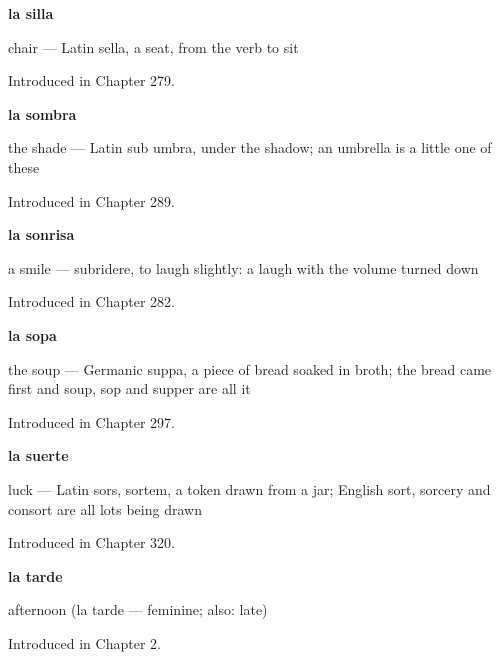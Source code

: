 \noindent\begin{minipage}[t]{\linewidth}
\raggedright
\textbf{la silla}\par
\small chair — Latin sella, a seat, from the verb to sit\par
\footnotesize Introduced in Chapter 279.
\end{minipage}\par\medskip

\noindent\begin{minipage}[t]{\linewidth}
\raggedright
\textbf{la sombra}\par
\small the shade — Latin sub umbra, under the shadow; an umbrella is a little one of these\par
\footnotesize Introduced in Chapter 289.
\end{minipage}\par\medskip

\noindent\begin{minipage}[t]{\linewidth}
\raggedright
\textbf{la sonrisa}\par
\small a smile — subridere, to laugh slightly: a laugh with the volume turned down\par
\footnotesize Introduced in Chapter 282.
\end{minipage}\par\medskip

\noindent\begin{minipage}[t]{\linewidth}
\raggedright
\textbf{la sopa}\par
\small the soup — Germanic suppa, a piece of bread soaked in broth; the bread came first and soup, sop and supper are all it\par
\footnotesize Introduced in Chapter 297.
\end{minipage}\par\medskip

\noindent\begin{minipage}[t]{\linewidth}
\raggedright
\textbf{la suerte}\par
\small luck — Latin sors, sortem, a token drawn from a jar; English sort, sorcery and consort are all lots being drawn\par
\footnotesize Introduced in Chapter 320.
\end{minipage}\par\medskip

\noindent\begin{minipage}[t]{\linewidth}
\raggedright
\textbf{la tarde}\par
\small afternoon (la tarde — feminine; also: late)\par
\footnotesize Introduced in Chapter 2.
\end{minipage}\par\medskip

